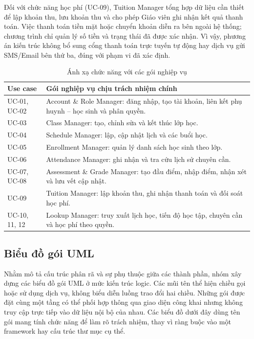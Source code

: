 Đối với chức năng học phí (UC-09), Tuition Manager tổng hợp dữ liệu cần thiết để lập khoản thu, lưu khoản thu và cho phép Giáo viên ghi nhận kết quả thanh toán. Việc thanh toán tiền mặt hoặc chuyển khoản diễn ra bên ngoài hệ thống; chương trình chỉ quản lý số tiền và trạng thái đã được xác nhận. Vì vậy, phương án kiến trúc không bổ sung cổng thanh toán trực tuyến tự động hay dịch vụ gửi SMS/Email bên thứ ba, đúng với phạm vi đã xác định.\par

\begin{table}[H]
\caption{Ánh xạ chức năng với các gói nghiệp vụ}
\centering
\small
\renewcommand{\arraystretch}{1.2}
\setlength{\tabcolsep}{5pt}
\begin{tabularx}{\linewidth}{|>{\raggedright\arraybackslash}p{2.65cm}|>{\raggedright\arraybackslash}X|}
\hline
\textbf{Use case} & \textbf{Gói nghiệp vụ chịu trách nhiệm chính} \\ \hline
UC-01, UC-02 & Account \& Role Manager: đăng nhập, tạo tài khoản, liên kết phụ huynh – học sinh và phân quyền. \\ \hline
UC-03 & Class Manager: tạo, chỉnh sửa và kết thúc lớp học. \\ \hline
UC-04 & Schedule Manager: lập, cập nhật lịch và các buổi học. \\ \hline
UC-05 & Enrollment Manager: quản lý danh sách học sinh theo lớp. \\ \hline
UC-06 & Attendance Manager: ghi nhận và tra cứu lịch sử chuyên cần. \\ \hline
UC-07, UC-08 & Assessment \& Grade Manager: tạo đầu điểm, nhập điểm, nhận xét và lưu vết cập nhật. \\ \hline
UC-09 & Tuition Manager: lập khoản thu, ghi nhận thanh toán và đối soát học phí. \\ \hline
UC-10, 11, 12 & Lookup Manager: truy xuất lịch học, tiến độ học tập, chuyên cần và học phí theo quyền. \\ \hline
\end{tabularx}

\label{tab:usecase-goi}
\end{table}

\subsection{Biểu đồ gói UML}

Nhằm mô tả cấu trúc phân rã và sự phụ thuộc giữa các thành phần, nhóm xây dựng các biểu đồ gói UML ở mức kiến trúc logic. Các mũi tên thể hiện chiều gọi hoặc sử dụng dịch vụ, không biểu diễn luồng trao đổi hai chiều. Những gói được đặt cùng một tầng có thể phối hợp thông qua giao diện công khai nhưng không truy cập trực tiếp vào dữ liệu nội bộ của nhau. Các biểu đồ dưới đây dùng tên gói mang tính chức năng để làm rõ trách nhiệm, thay vì ràng buộc vào một framework hay cấu trúc thư mục cụ thể.\par


